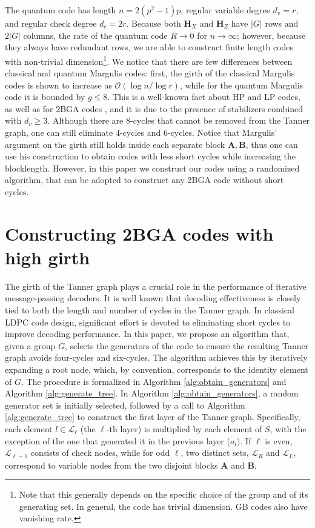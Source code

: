 \documentclass[a4paper,twocolumn,11pt,accepted=2026-05-03]{quantumarticle}
\begin{document}
The quantum code has length \mbox{$n=2(p^2-1)p$}, regular variable degree $d_v=r$, and regular check degree $d_c=2r$. Because both $\mathbf{H}_X$ and $\mathbf{H}_Z$ have $|G|$ rows and $2|G|$ columns, the rate of the quantum code $R \rightarrow 0$ for $n\rightarrow \infty$; however, because they always have redundant rows, we are able to construct finite length codes with non-trivial dimension\footnote{Note that this generally depends on the specific choice of the group and of its generating set. In general, the code has trivial dimension. GB codes also have vanishing rate.}.
We notice that there are few differences between classical and quantum Margulis codes: first, the girth of the classical Margulis codes is shown to increase as $\mathcal{O}(\log n / \log r)$, while for the quantum Margulis code it is bounded by $g\leq8$. This is a well-known fact about HP and LP codes, as well as for 2BGA codes \cite{raveendran_trapping_2021}, and it is due to the presence of stabilizers combined with $d_v\geq 3$. Although there are 8-cycles that cannot be removed from the Tanner graph, one can still eliminate 4-cycles and 6-cycles.
Notice that Margulis' argument on the girth still holds inside each separate block $\mathbf{A},\mathbf{B}$, thus one can use his construction to obtain codes with less short cycles while increasing the blocklength. However, in this paper we construct our codes using a randomized algorithm, that can be adopted to construct any 2BGA code without short cycles.


\section{Constructing 2BGA codes with high girth}
\label{sec:algorithm}

The girth of the Tanner graph plays a crucial role in the performance of iterative message-passing decoders. It is well known that decoding effectiveness is closely tied to both the length and number of cycles in the Tanner graph. In classical LDPC code design, significant effort is devoted to eliminating short cycles to improve decoding performance.  In this paper, we propose an algorithm that, given a group \( G \), selects the generators of the code to ensure the resulting Tanner graph avoids four-cycles and six-cycles. The algorithm achieves this by iteratively expanding a root node, which, by convention, corresponds to the identity element of \( G \). 
The procedure is formalized in Algorithm \ref{alg:obtain_generators} and Algorithm \ref{alg:generate_tree}. In Algorithm \ref{alg:obtain_generators}, a random generator set is initially selected, followed by a call to Algorithm \ref{alg:generate_tree} to construct the first layer of the Tanner graph. Specifically, each element \( l \in  \mathcal{L}_{\ell} \) (the $\ell$-th layer) is multiplied by each element of \( S \), with the exception of the one that generated it in the previous layer ($a_l)$. If \( \ell \) is even, \( \mathcal{L}_{\ell+1} \) consists of check nodes, while for odd \( \ell \), two distinct sets, \( \mathcal{L}_R \) and \( \mathcal{L}_L \), correspond to variable nodes from the two disjoint blocks $\mathbf{A}$ and $\mathbf{B}$. 
\end{document}
